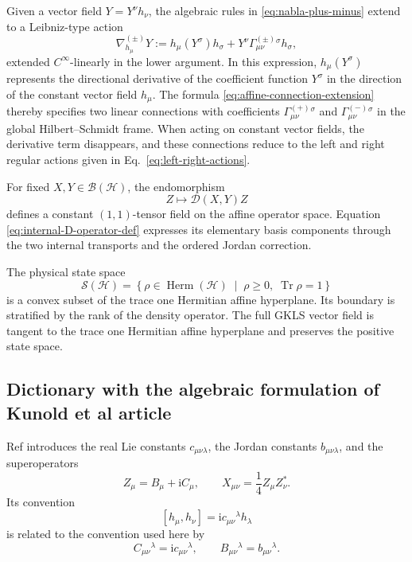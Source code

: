 \documentclass[notitlepage,aip,reprint,onecolumn]{revtex4-1}
\theoremstyle{definition}
\begin{document}
Given a vector field \(Y = Y^\nu h_\nu\), the algebraic rules in \eqref{eq:nabla-plus-minus} extend to a Leibniz-type action
\begin{equation}\label{eq:affine-connection-extension}
    \nabla^{(\pm)}_{h_\mu}Y
    :=
    h_\mu(Y^\sigma)h_\sigma
    +
    Y^\nu
    \Gamma^{(\pm)}_{\mu\nu}{}^\sigma h_\sigma,
\end{equation}
extended \(C^\infty\)-linearly in the lower argument. In this expression, \(h_\mu(Y^\sigma)\) represents the directional derivative of the coefficient function \(Y^\sigma\) in the direction of the constant vector field \(h_\mu\). The formula \eqref{eq:affine-connection-extension} thereby specifies two linear connections with coefficients 
\(\Gamma^{(+)}_{\mu\nu}{}^\sigma\) and \(\Gamma^{(-)}_{\mu\nu}{}^\sigma\) in the global Hilbert–Schmidt frame. When acting on constant vector fields, the derivative term disappears, and these connections reduce to the left and right regular actions given in Eq.~\eqref{eq:left-right-actions}.

For fixed \(X,Y\in\mathcal B(\mathcal H)\), the endomorphism
\[
    Z
    \longmapsto
    \mathcal D(X,Y)Z
\]
defines a constant \((1,1)\)-tensor field on the affine operator space. Equation \eqref{eq:internal-D-operator-def} expresses its elementary basis components through the two internal transports and the ordered Jordan correction.

The physical state space
\[
    \mathcal S(\mathcal H)
    =
    \left\{
    \rho\in\operatorname{Herm}(\mathcal H)
    \;\middle|\;
    \rho\geq0,\;
    \operatorname{Tr}\rho=1
    \right\}
\]
is a convex subset of the trace one Hermitian affine hyperplane. Its boundary is stratified by the rank of the density operator. The full GKLS vector field is tangent to the trace one Hermitian affine hyperplane and preserves the positive state space.

\subsection{Dictionary with the algebraic formulation of Kunold et al article}

Ref \cite{Bixano:2026qce} introduces the real Lie constants \(c_{\mu\nu\lambda}\), the Jordan constants \(b_{\mu\nu\lambda}\), and the superoperators
\[
    Z_\mu
    =
    B_\mu+\mathrm{i} C_\mu,
    \qquad
    X_{\mu\nu}
    =
    \frac14Z_\mu Z_\nu^*.
\]
Its convention
\[
    [h_\mu,h_\nu]
    =
    \mathrm{i} c_{\mu\nu}{}^\lambda h_\lambda
\]
is related to the convention used here by
\[
    C_{\mu\nu}{}^\lambda
    =
    \mathrm{i} c_{\mu\nu}{}^\lambda,
    \qquad
    B_{\mu\nu}{}^\lambda
    =
    b_{\mu\nu}{}^\lambda.
\]
\end{document}
